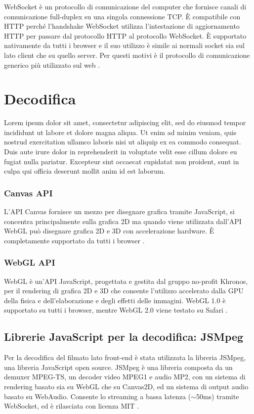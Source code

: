 WebSocket è un protocollo di comunicazione del computer che fornisce canali di comunicazione full-duplex su una singola connessione TCP. È compatibile con HTTP perché l'handshake WebSocket utilizza l'intestazione di aggiornamento HTTP per passare dal protocollo HTTP al protocollo WebSocket. È supportato nativamente da tutti i browser e il suo utilizzo è simile ai normali socket sia sul lato client che su quello server. Per questi motivi è il protocollo di comunicazione generico più utilizzato sul web \parencite{WebSocket_Web_APIs}.




\section{Decodifica}
Lorem ipsum dolor sit amet, consectetur adipiscing elit, sed do eiusmod tempor incididunt ut labore et dolore magna aliqua. Ut enim ad minim veniam, quis nostrud exercitation ullamco laboris nisi ut aliquip ex ea commodo consequat. Duis aute irure dolor in reprehenderit in voluptate velit esse cillum dolore eu fugiat nulla pariatur. Excepteur sint occaecat cupidatat non proident, sunt in culpa qui officia deserunt mollit anim id est laborum.

\subsubsection{Canvas API}
L'API Canvas fornisce un mezzo per disegnare grafica tramite JavaScript, si concentra principalmente sulla grafica 2D ma quando viene utilizzata dall'API WebGL può disegnare grafica 2D e 3D con accelerazione hardware. È completamente supportato da tutti i browser \parencite{Canvas_API}.

\subsubsection{WebGL API}
WebGL è un'API JavaScript, progettata e gestita dal gruppo no-profit Khronos, per il rendering di grafica 2D e 3D che consente l'utilizzo accelerato dalla GPU della fisica e dell'elaborazione e degli effetti delle immagini. WebGL 1.0 è supportato su tutti i browser, mentre WebGL 2.0 viene testato su Safari \parencite{WebGL}.

\subsection{Librerie JavaScript per la decodifica: JSMpeg}
Per la decodifica del filmato lato front-end è stata utilizzata la libreria JSMpeg, una libreria JavaScript open source. JSMpeg è una libreria composta da un demuxer MPEG-TS, un decoder video MPEG1 e audio MP2, con un sistema di rendering basato sia su WebGL che su Canvas2D, ed un sistema di output audio basato su WebAudio. Consente lo streaming a bassa latenza ($\sim$50ms) tramite WebSocket, ed è rilasciata con licenza MIT \parencite{JSMpeg}.




